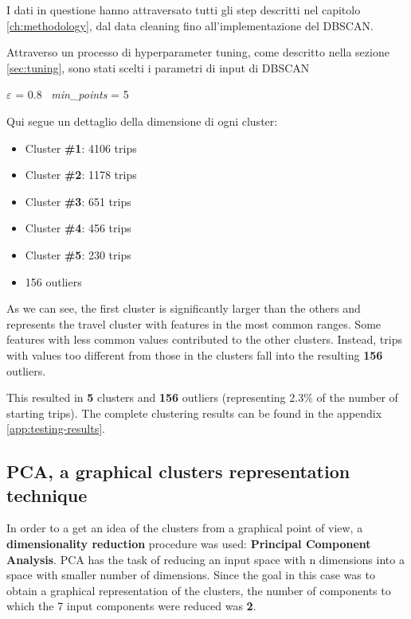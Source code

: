 I dati in questione hanno attraversato tutti gli step descritti nel capitolo \ref{ch:methodology}, dal data cleaning fino all'implementazione del DBSCAN.

Attraverso un processo di hyperparameter tuning, come descritto nella sezione \ref{sec:tuning}, sono stati scelti i parametri di input di DBSCAN 

\begin{center} 
    $\varepsilon$ = 0.8 \, \textit{min\_points} = 5
\end{center} 

Qui segue un dettaglio della dimensione di ogni cluster:
\begin{itemize}
\item Cluster \textbf{\#1}: 4106 trips
\item Cluster \textbf{\#2}: 1178 trips
\item Cluster \textbf{\#3}: 651 trips
\item Cluster \textbf{\#4}: 456 trips
\item Cluster \textbf{\#5}: 230 trips
\item 156 outliers
\end{itemize}

As we can see, the first cluster is significantly larger than the others and represents the travel cluster with features in the most common ranges. Some features with less common values contributed to the other clusters. Instead, trips with values too different from those in the clusters fall into the resulting \textbf{156} outliers.

This resulted in \textbf{5} clusters and \textbf{156} outliers (representing 2.3\% of the number of starting trips). The complete clustering results can be found in the appendix \ref{app:testing-results}.

\clearpage

\subsection{PCA, a graphical clusters representation technique}
\label{sec:pca}

In order to a get an idea of the clusters from a graphical point of view, a \textbf{dimensionality reduction} procedure was used: \textbf{Principal Component Analysis}.
PCA has the task of reducing an input space with n dimensions into a space with smaller number of dimensions.
Since the goal in this case was to obtain a graphical representation of the clusters, the number of components to which the 7 input components were reduced was \textbf{2}.

